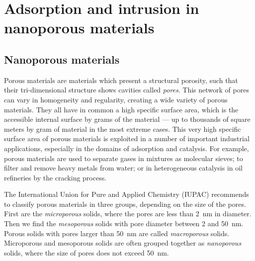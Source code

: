 \documentclass[thesis]{subfiles}
\begin{document}
\chapter{Adsorption and intrusion in nanoporous materials}
\vspace*{-1\baselineskip}
\section{Nanoporous materials}

Porous materials are materials which present a structural porosity, such that their
tri-dimensional structure shows cavities called \emph{pores}. This network
of pores can vary in homogeneity and regularity, creating a wide variety of
porous materials. They all have in common a high specific surface area, which is
the accessible internal surface by grams of the material --- up to thousands of
square meters by gram of material\cite{Farha2012} in the most extreme cases.
This very high specific surface area of porous materials is exploited in a
number of important industrial applications, especially in the domains of
adsorption and catalysis. For example, porous materials are used to separate
gases in mixtures as molecular sieves; to filter and remove heavy metals from
water; or in heterogeneous catalysis in oil refineries by the cracking process.

The International Union for Pure and Applied Chemistry (IUPAC) recommends to
classify porous materials in three groups, depending on the size of the
pores\cite{Rouquerol1994}. First are the \emph{microporous} solids, where the
pores are less than \SI{2}{nm} in diameter. Then we find the \emph{mesoporous}
solids with pore diameter between 2 and \SI{50}{nm}. Porous solids with pores
larger than \SI{50}{nm} are called \emph{macroporous} solids. Microporous and
mesoporous solids are often grouped together as \emph{nanoporous} solids, where
the size of pores does not exceed \SI{50}{nm}.
\end{document}
